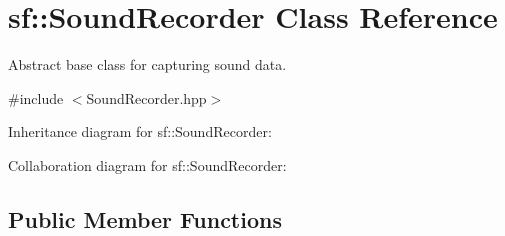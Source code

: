 \hypertarget{classsf_1_1_sound_recorder}{}\section{sf\+:\+:Sound\+Recorder Class Reference}
\label{classsf_1_1_sound_recorder}


Abstract base class for capturing sound data.  




{\ttfamily \#include $<$Sound\+Recorder.\+hpp$>$}



Inheritance diagram for sf\+:\+:Sound\+Recorder\+:


Collaboration diagram for sf\+:\+:Sound\+Recorder\+:
\subsection*{Public Member Functions}
